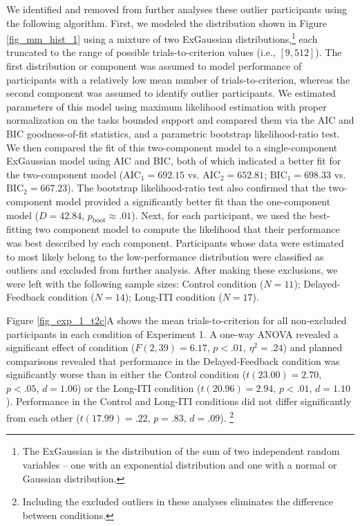 \documentclass[doc, floatsintext]{apa7}
\begin{document}
We identified and removed from further analyses these
outlier participants using the following algorithm. First,
we modeled the distribution shown in Figure
\ref{fig_mm_hist_1} using a mixture of two ExGaussian
distributions,\footnote{The ExGaussian is the distribution
of the sum of two independent random variables -- one with
an exponential distribution and one with a normal or
Gaussian distribution.} each truncated to the range of
possible trials-to-criterion values (i.e., $[9,512]$). The
first distribution or component was assumed to model
performance of participants with a relatively low mean
number of trials-to-criterion, whereas the second component
was assumed to identify outlier participants. We estimated
parameters of this model using maximum likelihood estimation
with proper normalization on the tasks bounded support and
compared them via the AIC and BIC goodness-of-fit
statistics, and a parametric bootstrap likelihood-ratio
test. We then compared the fit of this two-component model
to a single-component ExGaussian model using AIC and BIC,
both of which indicated a better fit for the two-component
model ($\mathrm{AIC}_1=692.15$ vs. $\mathrm{AIC}_2=652.81$;
$\mathrm{BIC}_1=698.33$ vs. $\mathrm{BIC}_2=667.23$). The
bootstrap likelihood-ratio test also confirmed that the
two-component model provided a significantly better fit than
the one-component model ($D=42.84$, $p_{\text{boot}}\approx
.01$). Next, for each participant, we used the
best-fitting two component model to compute the likelihood
that their performance was best described by each component.
Participants whose data were estimated to most likely belong
to the low-performance distribution were classified as
outliers and excluded from further analysis. After making
these exclusions, we were left with the following sample
sizes:  Control condition ($ N = 11$); Delayed-Feedback
condition ($N = 14$); Long-ITI condition ($N = 17$).

Figure \ref{fig_exp_1_t2c}A shows the mean
trials-to-criterion for all non-excluded participants in
each condition of Experiment 1.  A one-way ANOVA revealed a
significant effect of condition ($F(2, 39) = 6.17$, $p <
.01$, $\eta^2 = .24$) and planned comparisons revealed that
performance in the Delayed-Feedback condition was
significantly worse than in either the Control condition
($t(23.00) = 2.70$, $p < .05$, $d=1.06$) or the Long-ITI
condition ($t(20.96) = 2.94$, $p < .01$, $d=1.10$).
Performance in the Control and Long-ITI conditions did not
differ significantly from each other ($t(17.99) = .22$, $p
= .83$, $d=.09$). \footnote{Including the excluded outliers
in these analyses eliminates the difference between
conditions.}
\end{document}
